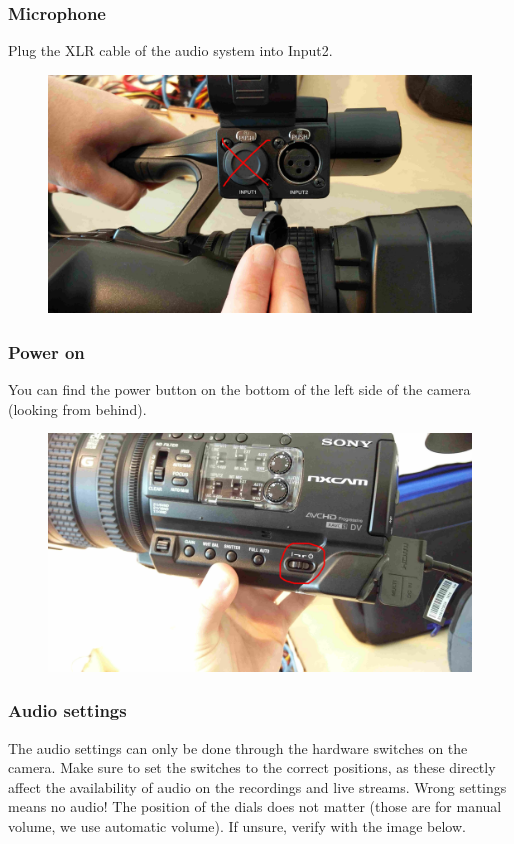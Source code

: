 \documentclass{article}
\begin{document}
\subsubsection{Microphone}
Plug the XLR cable of the audio system into Input2.

\begin{figure}[H]
  \centering
\includegraphics[width = 120mm]{Sony02.jpg}
\end{figure}

\subsubsection{Power on}
You can find the power button on the bottom of the left side of the camera (looking from behind).

\begin{figure}[H]
  \centering
\includegraphics[width = 120mm]{Sony03.jpg}
\end{figure}

\subsubsection{Audio settings}
The audio settings can only be done through the hardware switches on the camera.
Make sure to set the switches to the correct positions, as these directly affect the availability of audio on the recordings and live streams. Wrong settings means no audio!
The position of the dials does not matter (those are for manual volume, we use automatic volume).
If unsure, verify with the image below.
\end{document}
